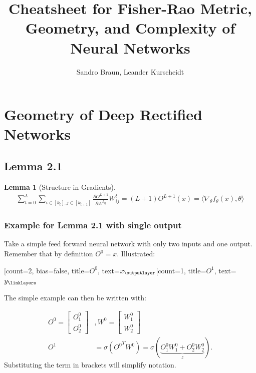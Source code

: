 \documentclass[a4paper]{article}
\title{Cheatsheet for Fisher-Rao Metric, Geometry, and Complexity of Neural Networks}
\author{Sandro Braun, Leander Kurscheidt}
\newtheorem{lemma}[theorem]{Lemma}
\begin{document}
\maketitle
\begin{abstract}
\end{abstract}
\section{Geometry of Deep Rectified Networks}


\subsection{Lemma 2.1}

\begin{lemma}[Structure in Gradients]
	\begin{align}
		\label{lemma_structure_in_gradient}
		\sum_{t=0}^{L} \sum_{i \in [k_t], j \in [k_{t+1}]} \frac{\partial O^{L+1}}{\partial W^{t_{ij}}} W^t_{ij} = (L+1)O^{L+1}(x) = \langle \nabla_\theta f_\theta (x), \theta \rangle
	\end{align}
\end{lemma}

\subsubsection{Example for Lemma 2.1 with single output}

Take a simple feed forward neural network with only two inputs and one output. Remember that by definition $O^0 = x$.
Illustrated: \\

\begin{neuralnetwork}[height=2]
	\newcommand{\nodetextx}[2]{$x_#2$}
	\newcommand{\nodetexty}[2]{$y_#2$}
	[count=2, bias=false, title=$O^0$, text=\nodetextx]
	\outputlayer[count=1, title=$O^1$, text=\nodetexty] \linklayers
\end{neuralnetwork}

The simple example can then be written with:

\begin{align}
	\label{eq_simple_nn}
	O^0 = 	\begin{bmatrix}
				O^0_1 \\ 
				O^0_2
			\end{bmatrix} &,
	W^0 = 	\begin{bmatrix}
				W^0_1 \\
				W^0_2
			\end{bmatrix} \\
			O^1 &= \sigma({O^0}^T W^0) = \sigma(
											\underbrace{O^0_1 W^0_1 + O^0_2 W^0_2}_z
											).
\end{align}
Substituting the term in brackets will simplify notation.
\end{document}

